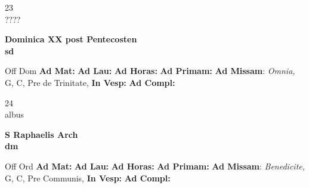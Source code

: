 \documentclass[10pt, openany]{book}
\begin{document}
    \begin{center}
        \begin{minipage}{3.5in}
            \vspace{2em}
            \begin{minipage}{0.5in}
                {\Huge 23} \\
                {\normalsize ????}
            \end{minipage}
            \begin{minipage}{3.0in}
                \textbf{ \large Dominica XX post Pentecosten \\
                \textnormal{\normalsize sd}}

            \end{minipage}
            \begin{justify}Off Dom
                \textbf{Ad Mat: }
                \textbf{Ad Lau: }
                \textbf{Ad Horas: }
                \textbf{Ad Primam: }\textbf{Ad Missam}: \textit{Omnia,} G, C, Pre de Trinitate, 
                \textbf{In Vesp: }
                \textbf{Ad Compl: }
            \end{justify}
        \end{minipage}
    \end{center}

    \begin{center}
        \begin{minipage}{3.5in}
            \vspace{2em}
            \begin{minipage}{0.5in}
                {\Huge 24} \\
                {\normalsize albus}
            \end{minipage}
            \begin{minipage}{3.0in}
                \textbf{ \large S Raphaelis Arch \\
                \textnormal{\normalsize dm}}

            \end{minipage}
            \begin{justify}Off Ord
                \textbf{Ad Mat: }
                \textbf{Ad Lau: }
                \textbf{Ad Horas: }
                \textbf{Ad Primam: }\textbf{Ad Missam}: \textit{Benedicite,} G, C, Pre Communis, 
                \textbf{In Vesp: }
                \textbf{Ad Compl: }
            \end{justify}
        \end{minipage}
    \end{center}
\end{document}
